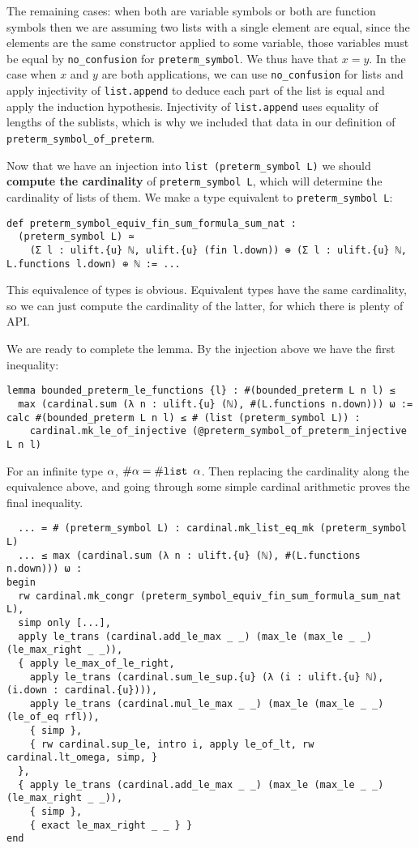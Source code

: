 The remaining cases: when both are variable symbols or both are function symbols
then we are assuming two lists with a single element are equal,
since the elements are the same constructor applied to some variable,
those variables must be equal by \texttt{no\_confusion} for
\texttt{preterm\_symbol}.
We thus have that $x = y$.
In the case when $x$ and $y$ are both applications,
we can use \texttt{no\_confusion} for lists and
apply injectivity of \texttt{list.append}
to deduce each part of the list is equal and apply the induction hypothesis.
Injectivity of \texttt{list.append} uses equality of lengths of the
sublists, which is why we included that data in our definition of
\texttt{preterm\_symbol\_of\_preterm}.

Now that we have an injection into \texttt{list (preterm\_symbol L)}
we should \textbf{compute the cardinality} of \texttt{preterm\_symbol L},
which will determine the cardinality of lists of them.
We make a type equivalent to \texttt{preterm\_symbol L}:

\begin{lstlisting}
def preterm_symbol_equiv_fin_sum_formula_sum_nat :
  (preterm_symbol L) ≃
    (Σ l : ulift.{u} ℕ, ulift.{u} (fin l.down)) ⊕ (Σ l : ulift.{u} ℕ, L.functions l.down) ⊕ ℕ := ... \end{lstlisting}

This equivalence of types is obvious.
Equivalent types have the same cardinality, so
we can just compute the cardinality of the latter,
for which there is plenty of API.

We are ready to complete the lemma.
By the injection above we have the first inequality:
\begin{lstlisting}
lemma bounded_preterm_le_functions {l} : #(bounded_preterm L n l) ≤
  max (cardinal.sum (λ n : ulift.{u} (ℕ), #(L.functions n.down))) ω :=
calc #(bounded_preterm L n l) ≤ # (list (preterm_symbol L)) :
    cardinal.mk_le_of_injective (@preterm_symbol_of_preterm_injective L n l)
\end{lstlisting}
For an infinite type $\alpha$, $\# \alpha = \# \texttt{list } \alpha$.
Then replacing the cardinality along the equivalence above,
and going through some simple cardinal arithmetic proves the final inequality.
\begin{lstlisting}
  ... = # (preterm_symbol L) : cardinal.mk_list_eq_mk (preterm_symbol L)
  ... ≤ max (cardinal.sum (λ n : ulift.{u} (ℕ), #(L.functions n.down))) ω :
begin
  rw cardinal.mk_congr (preterm_symbol_equiv_fin_sum_formula_sum_nat L),
  simp only [...],
  apply le_trans (cardinal.add_le_max _ _) (max_le (max_le _ _) (le_max_right _ _)),
  { apply le_max_of_le_right,
    apply le_trans (cardinal.sum_le_sup.{u} (λ (i : ulift.{u} ℕ), (i.down : cardinal.{u}))),
    apply le_trans (cardinal.mul_le_max _ _) (max_le (max_le _ _) (le_of_eq rfl)),
    { simp },
    { rw cardinal.sup_le, intro i, apply le_of_lt, rw cardinal.lt_omega, simp, }
  },
  { apply le_trans (cardinal.add_le_max _ _) (max_le (max_le _ _) (le_max_right _ _)),
    { simp },
    { exact le_max_right _ _ } }
end \end{lstlisting}

